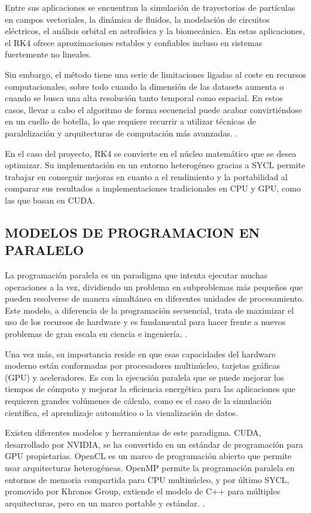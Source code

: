 Entre sus aplicaciones se encuentran la simulación de trayectorias de partículas en campos vectoriales, la dinámica de fluidos, la modelación de circuitos eléctricos, el análisis orbital en astrofísica y la biomecánica. En estas aplicaciones, el RK4 ofrece aproximaciones estables y confiables incluso en sistemas fuertemente no lineales.

Sin embargo, el método tiene una serie de limitaciones ligadas al coste en recursos computacionales, sobre todo cuando la dimensión de las datasets aumenta o cuando se busca una alta resolución tanto temporal como espacial. En estos casos, llevar a cabo el algoritmo de forma secuencial puede acabar convirtiéndose en un cuello de botella, lo que requiere recurrir a utilizar técnicas de paralelización y arquitecturas de computación más avanzadas. \cite{camp_streamline_2011}\cite{pugmire_scalable_2009}.

En el caso del proyecto, RK4 se convierte en el núcleo matemático que se desea optimizar. Su implementación en un entorno heterogéneo gracias a SYCL permite trabajar en conseguir mejoras en cuanto a el rendimiento y la portabilidad al comparar sus resultados a implementaciones tradicionales en CPU y GPU, como las que basan en CUDA.


\subsection{MODELOS DE PROGRAMACION EN PARALELO}

La programación paralela es un paradigma que intenta ejecutar muchas operaciones a la vez, dividiendo un problema en subproblemas más pequeños que pueden resolverse de manera simultánea en diferentes unidades de procesamiento. Este modelo, a diferencia de la programación secuencial, trata de maximizar el uso de los recursos de hardware y es fundamental para hacer frente a nuevos problemas de gran escala en ciencia e ingeniería. \cite{grama_introduction_2011}.

Una vez más, su importancia reside en que esas capacidades del hardware moderno están conformadas por procesadores multinúcleo, tarjetas gráficas (GPU) y aceleradores. Es con la ejecución paralela que se puede mejorar los tiempos de cómputo y mejorar la eficiencia energética para las aplicaciones que requieren grandes volúmenes de cálculo, como es el caso de la simulación científica, el aprendizaje automático o la visualización de datos.

Existen diferentes modelos y herramientas de este paradigma. CUDA, desarrollado por NVIDIA, se ha convertido en un estándar de programación para GPU propietarias. OpenCL es un marco de programación abierto que permite usar arquitecturas heterogéneas. OpenMP permite la programación paralela en entornos de memoria compartida para CPU multinúcleo, y por último SYCL, promovido por Khronos Group, extiende el modelo de C++ para múltiples arquitecturas, pero en un marco portable y estándar. \cite{the_khronos_group_inc_sycl_2025}\cite{reinders_data_2021}.


